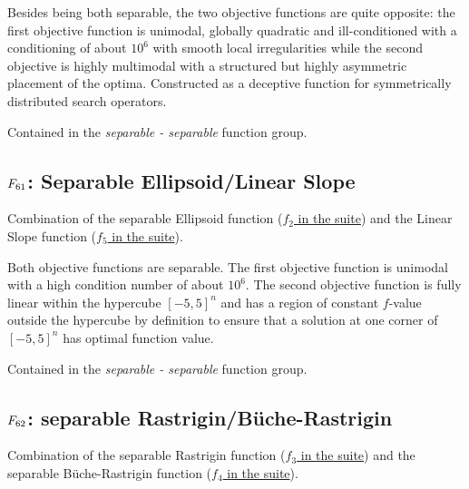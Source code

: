 Besides being both separable, the two objective functions are quite opposite:
the first objective function is unimodal, globally quadratic and ill-conditioned
with a conditioning of about \(10^6\) with smooth local irregularities while
the second objective is highly multimodal with a structured but highly asymmetric
placement of the optima. Constructed as a deceptive function for symmetrically
distributed search operators.

Contained in the \emph{separable - separable} function group.



\subsection[\texorpdfstring{\protect\(F_{61}\protect\): Separable Ellipsoid/Linear Slope}{F61: Separable Ellipsoid/Linear Slope}]{\texorpdfstring{\protect\(F_{61}\protect\): Separable Ellipsoid/Linear Slope}{}}
\label{index:f61}\label{index:separable-ellipsoid-linear-slope}
Combination of the separable Ellipsoid function (\href{https://coco.gforge.inria.fr/downloads/download16.00/bbobdocfunctions.pdf\#page=10}{\(f_2\) in the \bbob suite}) and the
Linear Slope function (\href{https://coco.gforge.inria.fr/downloads/download16.00/bbobdocfunctions.pdf\#page=25}{\(f_5\) in the \bbob suite}).

Both objective functions are separable. The first objective function
is unimodal with a high condition number of about \(10^6\). The second
objective function is fully linear within the hypercube \([-5,5]^n\) and
has a region of constant \(f\)-value outside the hypercube by definition to ensure
that a solution at one corner of \([-5,5]^n\) has optimal function value.

Contained in the \emph{separable - separable} function group.



\subsection[\texorpdfstring{\protect\(F_{62}\protect\): separable Rastrigin/B\"{u}che-Rastrigin}{F62: separable Rastrigin/B\"{u}che-Rastrigin}]{\texorpdfstring{\protect\(F_{62}\protect\): separable Rastrigin/B\"{u}che-Rastrigin}{}}
\label{index:separable-rastrigin-buche-rastrigin}\label{index:f62}
Combination of the separable Rastrigin function (\href{https://coco.gforge.inria.fr/downloads/download16.00/bbobdocfunctions.pdf\#page=15}{\(f_3\) in the \bbob suite}) and the
separable B\"{u}che-Rastrigin function (\href{https://coco.gforge.inria.fr/downloads/download16.00/bbobdocfunctions.pdf\#page=20}{\(f_4\) in the \bbob suite}).

